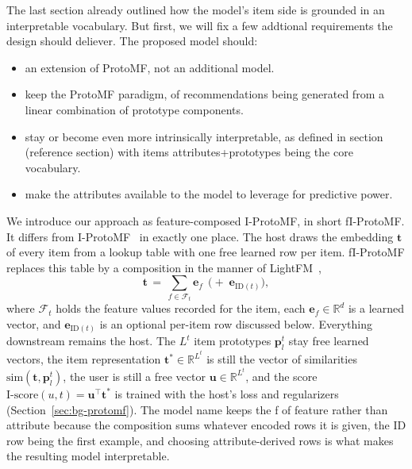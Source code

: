 The last section already outlined how the model's item side is grounded in an interpretable vocabulary. But first, we will 
fix a few addtional requirements the design should deliever. The proposed model should:
\begin{itemize}
\item an extension of ProtoMF, not an additional model.
\item keep the ProtoMF paradigm, of recommendations being generated from a linear combination of prototype components.
\item stay or become even more intrinsically interpretable, as defined in section (reference section) with items attributes+prototypes being the core vocabulary.
\item make the attributes available to the model to leverage for predictive power.
\end{itemize}

We introduce our approach as feature-composed I-ProtoMF, in short
fI-ProtoMF. It differs from I-ProtoMF~\cite{melchiorre2022protomf} in
exactly one place. The host draws the embedding $\mathbf{t}$ of every
item from a lookup table with one free learned row per item. fI-ProtoMF
replaces this table by a composition in the manner of
LightFM~\cite{kula2015lightfm},
\begin{equation}
\mathbf{t} \,=\, \sum_{f \in \mathcal{F}_t} \mathbf{e}_f
\;\,\bigl(+\; \mathbf{e}_{\mathrm{ID}(t)}\bigr),
\label{eq:fi-composition}
\end{equation}
where $\mathcal{F}_t$ holds the feature values recorded for the item,
each $\mathbf{e}_f \in \mathbb{R}^d$ is a learned vector, and
$\mathbf{e}_{\mathrm{ID}(t)}$ is an optional per-item row discussed
below. Everything downstream remains the host. The $L^t$ item prototypes
$\mathbf{p}^t_l$ stay free learned vectors, the item representation
$\mathbf{t}^* \in \mathbb{R}^{L^t}$ is still the vector of similarities
$\mathrm{sim}(\mathbf{t}, \mathbf{p}^t_l)$, the user is still a free
vector $\mathbf{u} \in \mathbb{R}^{L^t}$, and the score
$\text{I-score}(u,t) = \mathbf{u}^\top \mathbf{t}^*$ is trained with the
host's loss and regularizers (Section~\ref{sec:bg-protomf}). The model
name keeps the f of feature rather than attribute because the
composition sums whatever encoded rows it is given, the ID row being the
first example, and choosing attribute-derived rows is what makes the
resulting model interpretable.














